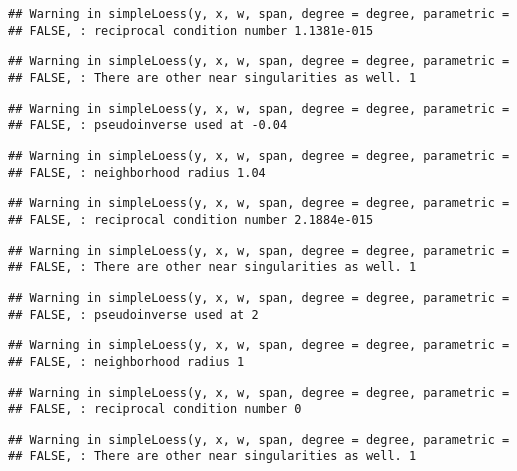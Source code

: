 \documentclass[]{article}
\begin{document}
\begin{verbatim}
## Warning in simpleLoess(y, x, w, span, degree = degree, parametric =
## FALSE, : reciprocal condition number 1.1381e-015
\end{verbatim}

\begin{verbatim}
## Warning in simpleLoess(y, x, w, span, degree = degree, parametric =
## FALSE, : There are other near singularities as well. 1
\end{verbatim}

\begin{verbatim}
## Warning in simpleLoess(y, x, w, span, degree = degree, parametric =
## FALSE, : pseudoinverse used at -0.04
\end{verbatim}

\begin{verbatim}
## Warning in simpleLoess(y, x, w, span, degree = degree, parametric =
## FALSE, : neighborhood radius 1.04
\end{verbatim}

\begin{verbatim}
## Warning in simpleLoess(y, x, w, span, degree = degree, parametric =
## FALSE, : reciprocal condition number 2.1884e-015
\end{verbatim}

\begin{verbatim}
## Warning in simpleLoess(y, x, w, span, degree = degree, parametric =
## FALSE, : There are other near singularities as well. 1
\end{verbatim}

\begin{verbatim}
## Warning in simpleLoess(y, x, w, span, degree = degree, parametric =
## FALSE, : pseudoinverse used at 2
\end{verbatim}

\begin{verbatim}
## Warning in simpleLoess(y, x, w, span, degree = degree, parametric =
## FALSE, : neighborhood radius 1
\end{verbatim}

\begin{verbatim}
## Warning in simpleLoess(y, x, w, span, degree = degree, parametric =
## FALSE, : reciprocal condition number 0
\end{verbatim}

\begin{verbatim}
## Warning in simpleLoess(y, x, w, span, degree = degree, parametric =
## FALSE, : There are other near singularities as well. 1
\end{verbatim}
\end{document}
